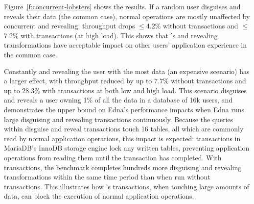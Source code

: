 %

%
Figure~\ref{f:concurrent-lobsters} shows the results.
%
If a random user disguises and reveals their data (the common case), normal
operations are mostly unaffected by concurrent \xxing and revealing: throughput
drops $\le$4.2\% without transactions and $\le$7.2\% with transactions (at high
load).
%
This shows that \sys's \xxing and revealing transformations have acceptable
impact on other users' application experience in the common case.

%
Constantly \xxing and revealing the user with the most data (an expensive 
scenario) has a larger effect, with throughput reduced by up to $7.7$\% without
transactions and up to 28.3\% with transactions at both low and high load.
%
%
%
This scenario disguises and reveals a user owning 1\% of all the data
in a database of 16k users, and demonstrates the upper bound on Edna’s
performance impacts when Edna runs large disguising and revealing transactions
continuously.  Because the queries within disguise and reveal transactions touch
16 tables, all which are commonly read by normal application operations, this
impact is expected: transactions in MariaDB's InnoDB storage engine lock any
written tables, preventing application operations from reading them until the
transaction has completed.
%
With transactions, the benchmark completes hundreds more disguising and
revealing transformations within the same time period than when run without
transactions. This illustrates how \sys's transactions, when touching large
amounts of data, can block the execution of normal application operations.

